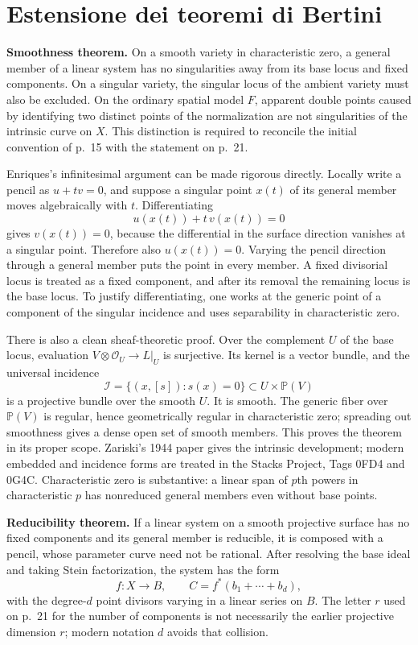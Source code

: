 \section{Estensione dei teoremi di Bertini}
\label{enriques-I-5}

\textbf{Smoothness theorem.} On a smooth variety in characteristic zero, a general member of a linear system has no singularities away from its base locus and fixed components. On a singular variety, the singular locus of the ambient variety must also be excluded. On the ordinary spatial model \(F\), apparent double points caused by identifying two distinct points of the normalization are not singularities of the intrinsic curve on \(X\). This distinction is required to reconcile the initial convention of p.~15 with the statement on p.~21.

Enriques's infinitesimal argument can be made rigorous directly. Locally write a pencil as \(u+t v=0\), and suppose a singular point \(x(t)\) of its general member moves algebraically with \(t\). Differentiating \[
u(x(t))+t\,v(x(t))=0
\] gives \(v(x(t))=0\), because the differential in the surface direction vanishes at a singular point. Therefore also \(u(x(t))=0\). Varying the pencil direction through a general member puts the point in every member. A fixed divisorial locus is treated as a fixed component, and after its removal the remaining locus is the base locus. To justify differentiating, one works at the generic point of a component of the singular incidence and uses separability in characteristic zero.

There is also a clean sheaf-theoretic proof. Over the complement \(U\) of the base locus, evaluation \(V\otimes\mathcal O_U\to L|_U\) is surjective. Its kernel is a vector bundle, and the universal incidence \[
\mathcal I=\{(x,[s]):s(x)=0\}\subset U\times\mathbb P(V)
\] is a projective bundle over the smooth \(U\). It is smooth. The generic fiber over \(\mathbb P(V)\) is regular, hence geometrically regular in characteristic zero; spreading out smoothness gives a dense open set of smooth members. This proves the theorem in its proper scope. Zariski's 1944 paper gives the intrinsic development; modern embedded and incidence forms are treated in the Stacks Project, Tags 0FD4 and 0G4C. Characteristic zero is substantive: a linear span of \(p\)th powers in characteristic \(p\) has nonreduced general members even without base points.

\textbf{Reducibility theorem.} If a linear system on a smooth projective surface has no fixed components and its general member is reducible, it is composed with a pencil, whose parameter curve need not be rational. After resolving the base ideal and taking Stein factorization, the system has the form \[
f:X\longrightarrow B,\qquad
C=f^*(b_1+\cdots+b_d),
\] with the degree-\(d\) point divisors varying in a linear series on \(B\). The letter \(r\) used on p.~21 for the number of components is not necessarily the earlier projective dimension \(r\); modern notation \(d\) avoids that collision.

